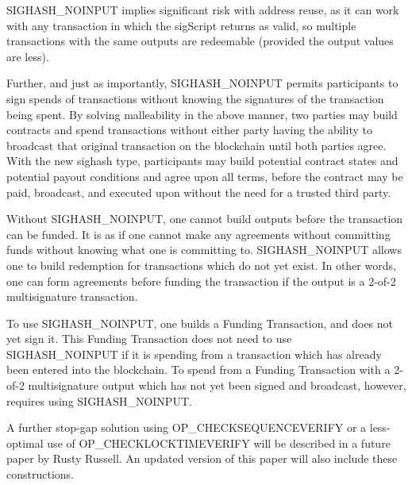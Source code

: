 \documentclass[letterpaper,11pt]{article}
\begin{document}
\begin{appendices}
SIGHASH\_NOINPUT implies significant risk with address reuse, as it can work
with any transaction in which the sigScript returns as valid, so multiple
transactions with the same outputs are redeemable (provided the output values
are less).

Further, and just as importantly, SIGHASH\_NOINPUT permits participants to sign
spends of transactions without knowing the signatures of the transaction being
spent. By solving malleability in the above manner, two parties may build
contracts and spend transactions without either party having the ability to
broadcast that original transaction on the blockchain until both parties agree.
With the new sighash type, participants may build potential contract states and
potential payout conditions and agree upon all terms, before the contract may be
paid, broadcast, and executed upon without the need for a trusted third party.

Without SIGHASH\_NOINPUT, one cannot build outputs before the transaction can be
funded. It is as if one cannot make any agreements without committing funds
without knowing what one is committing to. SIGHASH\_NOINPUT allows one to build
redemption for transactions which do not yet exist. In other words, one can form
agreements before funding the transaction if the output is a 2-of-2
multisignature transaction.

To use SIGHASH\_NOINPUT, one builds a Funding Transaction, and does not yet sign
it. This Funding Transaction does not need to use SIGHASH\_NOINPUT if it is
spending from a transaction which has already been entered into the blockchain.
To spend from a Funding Transaction with a 2-of-2 multisignature output which
has not yet been signed and broadcast, however, requires using SIGHASH\_NOINPUT.

A further stop-gap solution using OP\_CHECKSEQUENCEVERIFY or a less-optimal use
of OP\_CHECKLOCKTIMEVERIFY will be described in a future paper by Rusty Russell.
An updated version of this paper will also include these constructions.

\end{appendices}



\end{document}
